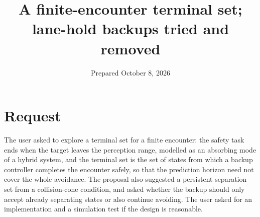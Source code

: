 \documentclass[11pt]{article}
\title{A finite-encounter terminal set; lane-hold backups tried and removed}
\date{Prepared October 8, 2026}
\begin{document}
\maketitle

\section{Request}
The user asked to explore a terminal set for a finite encounter: the safety
task ends when the target leaves the perception range, modelled as an
absorbing mode of a hybrid system, and the terminal set is the set of states
from which a backup controller completes the encounter safely, so that the
prediction horizon need not cover the whole avoidance. The proposal also
suggested a persistent-separation set from a collision-cone condition, and
asked whether the backup should only accept already separating states or
also continue avoiding. The user asked for an implementation and a
simulation test if the design is reasonable.
\end{document}

